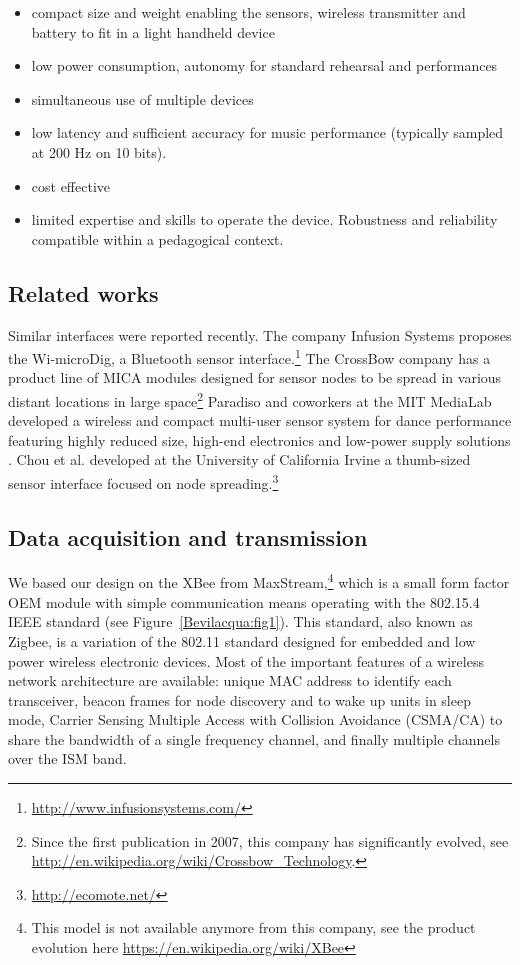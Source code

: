 \begin{itemize}
\item compact size and weight enabling the sensors, wireless transmitter and battery to fit in a light handheld device
\item low power consumption, autonomy for standard rehearsal and performances
\item simultaneous use of multiple devices
\item low latency and sufficient accuracy  for music performance (typically sampled at 200 Hz on 10 bits).
\item cost effective
\item limited expertise and skills to operate the device. Robustness and reliability compatible within a pedagogical context.
 \end{itemize}

\subsection{Related works} 
Similar interfaces were reported recently. The company Infusion Systems proposes the Wi-microDig, a Bluetooth sensor interface.\footnote{\url{http://www.infusionsystems.com/}} The CrossBow company has a product line of MICA modules designed for sensor nodes to be spread in various distant locations in large space\footnote{Since the first publication in 2007, this company has significantly evolved, see \url{http://en.wikipedia.org/wiki/Crossbow\_Technology}.} Paradiso and coworkers at the MIT MediaLab developed a wireless and compact multi-user sensor system for dance performance featuring highly reduced size, high-end electronics and low-power supply solutions \cite{Aylward:2006}. Chou et al. developed at the University of California Irvine a thumb-sized sensor interface focused on node spreading.\footnote{\url{http://ecomote.net/}}

\subsection{Data acquisition and transmission}
We based our design on the XBee from MaxStream,\footnote{This model is not available anymore from this company, see the product evolution here \url{https://en.wikipedia.org/wiki/XBee}} which is a small form factor OEM module with simple communication means operating with the 802.15.4 IEEE standard (see Figure~\ref{Bevilacqua:fig1}). This standard, also known as Zigbee, is a variation of the 802.11 standard designed for embedded and low power wireless electronic devices. Most of the important features of a wireless network architecture are available: unique MAC address to identify each transceiver, beacon frames for node discovery and to wake up units in sleep mode, Carrier Sensing Multiple Access with Collision Avoidance (CSMA/CA) to share the bandwidth of a single frequency channel, and finally multiple channels over the ISM band.

